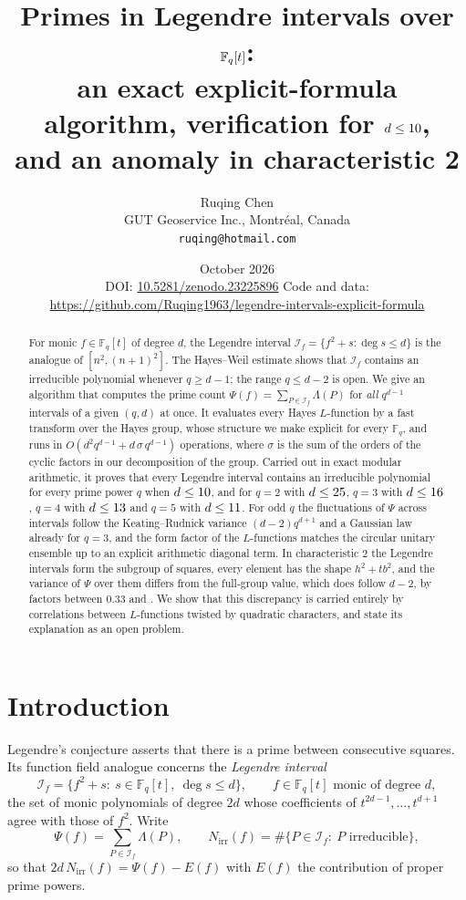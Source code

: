 \documentclass[11pt,a4paper]{article}
\title{\textbf{Primes in Legendre intervals over $\Fq[t]$:\\
an exact explicit-formula algorithm, verification for $d\le10$,\\
and an anomaly in characteristic 2}}
\author{Ruqing Chen\\[3pt]
\small GUT Geoservice Inc., Montr\'eal, Canada\\
\small \texttt{ruqing@hotmail.com}}
\date{October 2026\\[2pt]\small DOI: \href{https://doi.org/10.5281/zenodo.23225896}{10.5281/zenodo.23225896}\quad
Code and data: \url{https://github.com/Ruqing1963/legendre-intervals-explicit-formula}}
\theoremstyle{definition}
\theoremstyle{remark}
\newcommand{\Fq}{\mathbb{F}_q}
\newcommand{\cI}{\mathcal{I}}
\newcommand{\Nirr}{N_{\mathrm{irr}}}
\begin{document}
\maketitle

\begin{abstract}
For monic $f\in\Fq[t]$ of degree $d$, the Legendre interval $\cI_f=\{f^2+s:\deg s\le d\}$ is
the analogue of $[n^2,(n+1)^2]$. The Hayes--Weil estimate shows that $\cI_f$ contains an
irreducible polynomial whenever $q\ge d-1$; the range $q\le d-2$ is open. We give an algorithm
that computes the prime count $\Psi(f)=\sum_{P\in\cI_f}\Lambda(P)$ for \emph{all} $q^{d-1}$
intervals of a given $(q,d)$ at once. It evaluates every Hayes $L$-function by a fast
transform over the Hayes group, whose structure we make explicit for every $\Fq$, and runs in
$O(d^2q^{d-1}+d\,\sigma\,q^{d-1})$ operations, where $\sigma$ is the sum of the orders of the cyclic
factors in our decomposition of the group. Carried out in exact modular arithmetic, it proves that every Legendre interval
contains an irreducible polynomial for every prime power $q$ when $d\le10$, and for $q=2$
with $d\le25$, $q=3$ with $d\le16$, $q=4$ with $d\le13$ and $q=5$ with
$d\le11$. For odd $q$ the fluctuations of $\Psi$ across intervals follow the
Keating--Rudnick variance $(d-2)q^{d+1}$ and a Gaussian law already for $q=3$, and the
form factor of the $L$-functions matches the circular unitary ensemble up to an explicit
arithmetic diagonal term. In characteristic $2$ the Legendre intervals form the subgroup of
squares, every element has the shape $h^2+tb^2$, and the variance of $\Psi$ over them differs
from the full-group value, which does follow $d-2$, by factors between $0.33$ and \MaxExcess.
We show that this discrepancy is carried entirely by correlations between $L$-functions twisted by
quadratic characters, and state its explanation as an open problem.
\end{abstract}

\tableofcontents
\bigskip

\section{Introduction}

Legendre's conjecture asserts that there is a prime between consecutive squares. Its function
field analogue concerns the \emph{Legendre interval}
\[
 \cI_f=\{f^2+s:\ s\in\Fq[t],\ \deg s\le d\},\qquad f\in\Fq[t]\text{ monic of degree }d,
\]
the set of monic polynomials of degree $2d$ whose coefficients of $t^{2d-1},\dots,t^{d+1}$
agree with those of $f^2$. Write
\[
 \Psi(f)=\sum_{P\in\cI_f}\Lambda(P),\qquad \Nirr(f)=\#\{P\in\cI_f:\ P\text{ irreducible}\},
\]
so that $2d\,\Nirr(f)=\Psi(f)-E(f)$ with $E(f)$ the contribution of proper prime powers.
\end{document}
